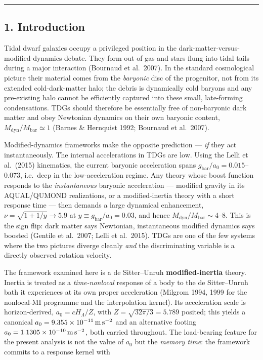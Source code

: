 \documentclass[
]{article}
\begin{document}
\begin{center}\rule{0.5\linewidth}{0.5pt}\end{center}

\subsection{1. Introduction}\label{introduction}

Tidal dwarf galaxies occupy a privileged position in the
dark-matter-versus-modified-dynamics debate. They form out of gas and
stars flung into tidal tails during a major interaction (Bournaud et
al.~2007). In the standard cosmological picture their material comes
from the \emph{baryonic} disc of the progenitor, not from its extended
cold-dark-matter halo; the debris is dynamically cold baryons and any
pre-existing halo cannot be efficiently captured into these small,
late-forming condensations. TDGs should therefore be essentially free of
non-baryonic dark matter and obey Newtonian dynamics on their own
baryonic content, \(M_\mathrm{dyn}/M_\mathrm{bar}\simeq 1\) (Barnes \&
Hernquist 1992; Bournaud et al.~2007).

Modified-dynamics frameworks make the opposite prediction --- \emph{if}
they act instantaneously. The internal accelerations in TDGs are low.
Using the Lelli et al.~(2015) kinematics, the current baryonic
acceleration spans \(g_\mathrm{bar}/a_0 = 0.015\)--\(0.073\), i.e.~deep in
the low-acceleration regime. Any theory whose boost function responds to
the \emph{instantaneous} baryonic acceleration --- modified gravity in
its AQUAL/QUMOND realizations, or a modified-inertia theory with a short
response time --- then demands a large dynamical enhancement,
\(\nu = \sqrt{1+1/y}\to 5.9\) at \(y\equiv g_\mathrm{bar}/a_0 = 0.03\), and
hence \(M_\mathrm{dyn}/M_\mathrm{bar}\sim 4\)--\(8\). This is the sign flip:
dark matter says Newtonian, instantaneous modified dynamics says boosted
(Gentile et al.~2007; Lelli et al.~2015). TDGs are one of the few
systems where the two pictures diverge cleanly \emph{and} the
discriminating variable is a directly observed rotation velocity.

The framework examined here is a de Sitter--Unruh
\textbf{modified-inertia} theory. Inertia is treated as a
\emph{time-nonlocal} response of a body to the de Sitter--Unruh bath it
experiences at its own proper acceleration (Milgrom 1994, 1999 for the
nonlocal-MI programme and the interpolation kernel). Its acceleration
scale is horizon-derived, \(a_0 = cH_\Lambda/Z\), with
\(Z=\sqrt{32\pi/3}=5.789\) posited; this yields a canonical
\(a_0 = 9.355\times10^{-11}\,{\rm m\,s^{-2}}\) and an alternative
footing \(a_0 = 1.1305\times10^{-10}\,{\rm m\,s^{-2}}\), both carried
throughout. The load-bearing feature for the present analysis is not the
value of \(a_0\) but the \emph{memory time}: the framework commits to a
response kernel with
\end{document}
